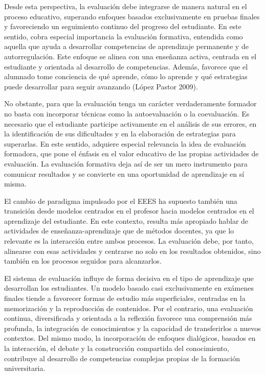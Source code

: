 \documentclass[
  11pt,
  a4paper,
  twoside]{scrreprt}
\begin{document}
Desde esta perspectiva, la evaluación debe integrarse de manera natural
en el proceso educativo, superando enfoques basados exclusivamente en
pruebas finales y favoreciendo un seguimiento continuo del progreso del
estudiante. En este sentido, cobra especial importancia la evaluación
formativa, entendida como aquella que ayuda a desarrollar competencias
de aprendizaje permanente y de autorregulación. Este enfoque se alinea
con una enseñanza activa, centrada en el estudiante y orientada al
desarrollo de competencias. Además, favorece que el alumnado tome
conciencia de qué aprende, cómo lo aprende y qué estrategias puede
desarrollar para seguir avanzando (López Pastor 2009).

No obstante, para que la evaluación tenga un carácter verdaderamente
formador no basta con incorporar técnicas como la autoevaluación o la
coevaluación. Es necesario que el estudiante participe activamente en el
análisis de sus errores, en la identificación de sus dificultades y en
la elaboración de estrategias para superarlas. En este sentido, adquiere
especial relevancia la idea de evaluación formadora, que pone el énfasis
en el valor educativo de las propias actividades de evaluación. La
evaluación formativa deja así de ser un mero instrumento para comunicar
resultados y se convierte en una oportunidad de aprendizaje en sí misma.

El cambio de paradigma impulsado por el EEES ha supuesto también una
transición desde modelos centrados en el profesor hacia modelos
centrados en el aprendizaje del estudiante. En este contexto, resulta
más apropiado hablar de actividades de enseñanza-aprendizaje que de
métodos docentes, ya que lo relevante es la interacción entre ambos
procesos. La evaluación debe, por tanto, alinearse con esas actividades
y centrarse no solo en los resultados obtenidos, sino también en los
procesos seguidos para alcanzarlos.

El sistema de evaluación influye de forma decisiva en el tipo de
aprendizaje que desarrollan los estudiantes. Un modelo basado casi
exclusivamente en exámenes finales tiende a favorecer formas de estudio
más superficiales, centradas en la memorización y la reproducción de
contenidos. Por el contrario, una evaluación continua, diversificada y
orientada a la reflexión favorece una comprensión más profunda, la
integración de conocimientos y la capacidad de transferirlos a nuevos
contextos. Del mismo modo, la incorporación de enfoques dialógicos,
basados en la interacción, el debate y la construcción compartida del
conocimiento, contribuye al desarrollo de competencias complejas propias
de la formación universitaria.
\end{document}
